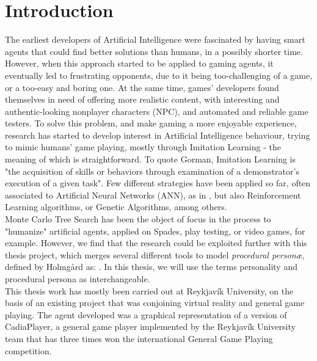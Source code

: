 \chapter{Introduction}
The earliest developers of Artificial Intelligence were fascinated by having smart agents that could find better solutions than humans, in a possibly shorter time. However, when this approach started to be applied to gaming agents, it eventually led to frustrating opponents\cite{soni2008bots}, due to it being too-challenging of a game, or a too-easy and boring one. At the same time, games' developers found themselves in need of offering more realistic content, with interesting and authentic-looking nonplayer characters (NPC)\cite{togelius2011search}, and automated and reliable game testers\cite{holmgaard2015monte}. To solve this problem, and make gaming a more enjoyable experience, research has started to develop interest in Artificial Intelligence behaviour, trying to mimic humans' game playing, mostly through Imitation Learning - the meaning of which is straightforward. To quote Gorman\cite{gorman2006believability}, Imitation Learning is "the acquisition of skills or
behaviors through examination of a demonstrator’s execution of a given task". Few different strategies have been applied so far, often associated to Artificial Neural Networks (ANN), as in \cite{soni2008bots,cho2006exploiting,zanetti2004machine,spronck2003improving,mirandaneuroevolution}, but also Reinforcement Learning algorithms\cite{spronck2003online}, or Genetic Algorithms\cite{martinez2016creating}, among others.\\
Monte Carlo Tree Search has been the object of focus in the process to "humanize" artificial agents, applied on Spades\cite{devlin2016combining}, play testing\cite{holmgaard2015monte}, or video games\cite{khalifamodifying}, for example. However, we find that the research could be exploited further with this thesis project, which merges several different tools to model \emph{procedural personæ}, defined by Holmgård as: \cite{holmgaard2016procedural}. In this thesis, we will use the terms personality and procedural persona as interchangeable.\\
This thesis work has mostly been carried out at Reykjavík University, on the basis of an existing project that was conjoining virtual reality and general game playing\cite{helgadottir2016virtual}. The agent developed was a graphical representation of a version of CadiaPlayer\cite{cadiaplayer}, a general game player implemented by the Reykjavík University team that has three times won the international General Game Playing competition\cite{genesereth2013international}. 
